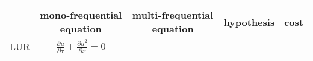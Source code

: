 
\begin{table}[htp]
  \centering
  \begin{tabular}{l|cccc}
    \toprule
    & mono-frequential equation & 
    multi-frequential equation & 
    hypothesis &
    cost \\
    \midrule
    LUR & 
    $\displaystyle \frac{\partial \overline{u}}{\partial \tau} +
			\frac{\partial 
				\overline{u}^2}{\partial x} = 0$\\
    \bottomrule
  \end{tabular}
\end{table}  